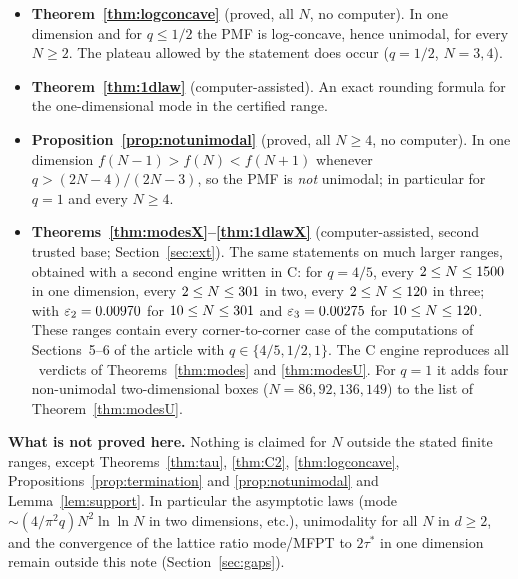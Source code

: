 \documentclass[11pt,a4paper]{article}
\theoremstyle{definition}
\theoremstyle{remark}
\begin{document}
\begin{itemize}
\item \textbf{Theorem~\ref{thm:logconcave}} (proved, all $N$, no computer). In one dimension and for $q\le 1/2$ the PMF is log-concave, hence unimodal, for every $N\ge 2$. The plateau allowed by the statement does occur ($q=1/2$, $N=3,4$).
\item \textbf{Theorem~\ref{thm:1dlaw}} (computer-assisted). An exact rounding formula for the one-dimensional mode in the certified range.
\item \textbf{Proposition~\ref{prop:notunimodal}} (proved, all $N\ge4$, no computer). In one dimension $f(N-1)>f(N)<f(N+1)$ whenever $q>(2N-4)/(2N-3)$, so the PMF is \emph{not} unimodal; in particular for $q=1$ and every $N\ge4$.
\item \textbf{Theorems~\ref{thm:modesX}--\ref{thm:1dlawX}} (computer-assisted, second trusted base; Section~\ref{sec:ext}). The same statements on much larger ranges, obtained with a second engine written in C: for $q=4/5$, every $2\le N\le1500$ in one dimension\XAlsoOneF, every $2\le N\le301$ in two\XAlsoTwoF, every $2\le N\le120$ in three\XAlsoThreeF; with $\varepsilon_2=0.00970$ for $10\le N\le301$ and $\varepsilon_3=0.00275$ for $10\le N\le120$. These ranges contain every corner-to-corner case of the computations of Sections~5--6 of the article with $q\in\{4/5,1/2,1\}$. The C engine reproduces all \TotalCerts\ verdicts of Theorems~\ref{thm:modes} and \ref{thm:modesU}. For $q=1$ it adds four non-unimodal two-dimensional boxes ($N=86,92,136,149$) to the list of Theorem~\ref{thm:modesU}.
\end{itemize}

\textbf{What is not proved here.} Nothing is claimed for $N$ outside the stated finite ranges, except Theorems~\ref{thm:tau}, \ref{thm:C2}, \ref{thm:logconcave}, Propositions~\ref{prop:termination} and \ref{prop:notunimodal} and Lemma~\ref{lem:support}. In particular the asymptotic laws (mode $\sim (4/\pi^2q)N^2\ln\ln N$ in two dimensions, etc.), unimodality for all $N$ in $d\ge2$, and the convergence of the lattice ratio mode/MFPT to $2\tau^*$ in one dimension remain outside this note (Section~\ref{sec:gaps}).
\end{document}
